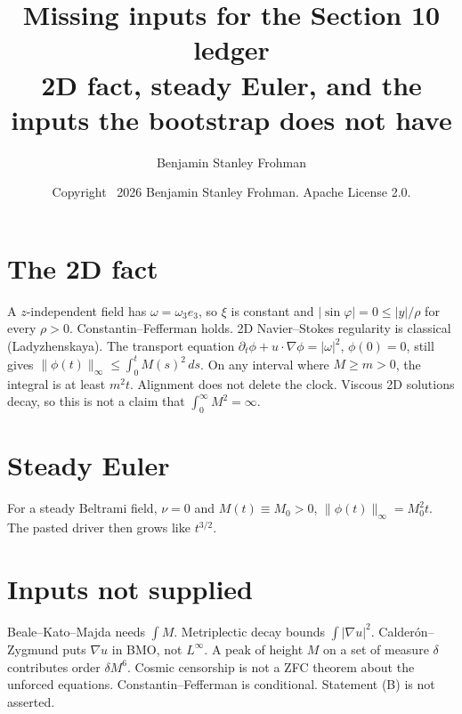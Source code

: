 \documentclass[11pt]{article}
\title{Missing inputs for the Section 10 ledger\\
\large 2D fact, steady Euler, and the inputs the bootstrap does not have}
\author{Benjamin Stanley Frohman}
\date{Copyright \textcopyright\ 2026 Benjamin Stanley Frohman. Apache License 2.0.}
\begin{document}
\maketitle
\section{The 2D fact}
A $z$-independent field has $\omega=\omega_3 e_3$, so $\xi$ is constant and
$|\sin\varphi|=0\le|y|/\rho$ for every $\rho>0$. Constantin--Fefferman holds.
2D Navier--Stokes regularity is classical (Ladyzhenskaya).
The transport equation $\partial_t\phi+u\cdot\nabla\phi=|\omega|^2$, $\phi(0)=0$,
still gives $\|\phi(t)\|_\infty\le\int_0^t M(s)^2\,ds$.
On any interval where $M\ge m>0$, the integral is at least $m^2 t$.
Alignment does not delete the clock.
Viscous 2D solutions decay, so this is not a claim that $\int_0^\infty M^2=\infty$.
\section{Steady Euler}
For a steady Beltrami field, $\nu=0$ and $M(t)\equiv M_0>0$,
$\|\phi(t)\|_\infty=M_0^2 t$. The pasted driver then grows like $t^{3/2}$.
\section{Inputs not supplied}
Beale--Kato--Majda needs $\int M$. Metriplectic decay bounds $\int|\nabla u|^2$.
Calder\'on--Zygmund puts $\nabla u$ in BMO, not $L^\infty$.
A peak of height $M$ on a set of measure $\delta$ contributes order $\delta M^6$.
Cosmic censorship is not a ZFC theorem about the unforced equations.
Constantin--Fefferman is conditional.
Statement (B) is not asserted.
\end{document}
